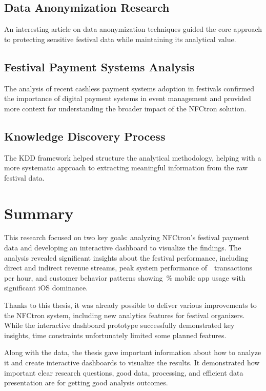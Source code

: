 \subsection*{Data Anonymization Research}
\label{subsec:data-anonymization-research}
An interesting article on data anonymization techniques guided the core approach to protecting sensitive festival data while maintaining its analytical value.

\begin{flushleft}
	\small{}
\end{flushleft}

\subsection*{Festival Payment Systems Analysis}
\label{subsec:festival-payment-systems-analysis}
The analysis of recent cashless payment systems adoption in festivals confirmed the importance of digital payment systems in event management and provided more context for understanding the broader impact of the NFCtron solution.

\small{}

\subsection*{Knowledge Discovery Process}
\label{subsec:knowledge-discovery-process}
The KDD framework helped structure the analytical methodology, helping with a more systematic approach to extracting meaningful information from the raw festival data.

\small{}

\pagebreak[4]

\section*{Summary}
\label{sec:summary}
This research focused on two key goals: analyzing NFCtron's festival payment data and developing an interactive dashboard to visualize the findings.
The analysis revealed significant insights about the festival performance, including direct and indirect revenue streams, peak system performance of~~transactions per hour,
and customer behavior patterns showing~\% mobile app usage with significant iOS dominance.

Thanks to this thesis, it was already possible to deliver various improvements to the NFCtron system, including new analytics features for festival organizers.
While the interactive dashboard prototype successfully demonstrated key insights, time constraints unfortunately limited some planned features.

Along with the data, the thesis gave important information about how to analyze it and create interactive dashboards to visualize the results.
It demonstrated how important clear research questions, good data, processing, and efficient data presentation are for getting good analysis outcomes.
